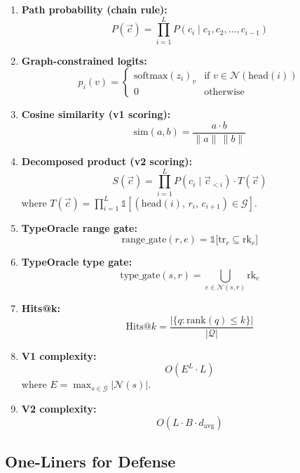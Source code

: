 \documentclass[11pt,a4paper]{article}
\begin{document}
\begin{enumerate}[leftmargin=*,itemsep=6pt]

\item \textbf{Path probability (chain rule):}
\[
P(\vec{c}) = \prod_{i=1}^{L} P(c_i \mid c_1, c_2, \dots, c_{i-1})
\]

\item \textbf{Graph-constrained logits:}
\[
p_i(v) = \begin{cases}
\text{softmax}(z_i)_v & \text{if } v \in \mathcal{N}(\text{head}(i)) \\
0 & \text{otherwise}
\end{cases}
\]

\item \textbf{Cosine similarity (v1 scoring):}
\[
\text{sim}(a, b) = \frac{a \cdot b}{\|a\|\,\|b\|}
\]

\item \textbf{Decomposed product (v2 scoring):}
\[
S(\vec{c}) = \prod_{i=1}^{L} P(c_i \mid \vec{c}_{<i}) \cdot T(\vec{c})
\]
where $T(\vec{c}) = \prod_{i=1}^{L} \mathbb{1}[(\text{head}(i),\, r_i,\, c_{i+1}) \in \mathcal{G}]$.

\item \textbf{TypeOracle range gate:}
\[
\text{range\_gate}(r, e) = \mathbb{1}\big[\text{tr}_r \subseteq \text{rk}_e\big]
\]

\item \textbf{TypeOracle type gate:}
\[
\text{type\_gate}(s, r) = \bigcup_{e \in \mathcal{N}(s,r)} \text{rk}_e
\]

\item \textbf{Hits@k:}
\[
\text{Hits@}k = \frac{|\{q : \text{rank}(q) \leq k\}|}{|\mathcal{Q}|}
\]

\item \textbf{V1 complexity:}
\[
O(E^L \cdot L)
\]
where $E = \max_{s \in \mathcal{G}} |\mathcal{N}(s)|$.

\item \textbf{V2 complexity:}
\[
O(L \cdot B \cdot d_{\text{avg}})
\]

\end{enumerate}

\subsection*{One-Liners for Defense}
\end{document}
